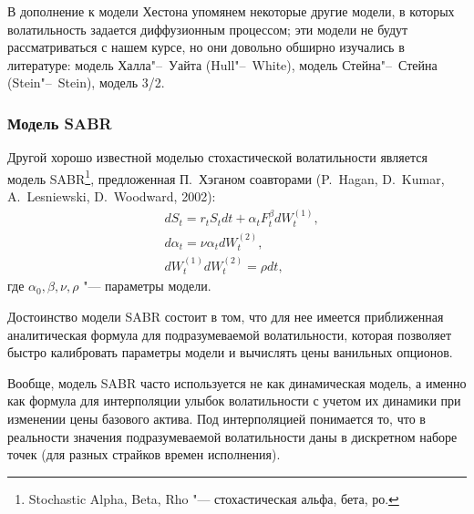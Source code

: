 
В дополнение к модели Хестона упомянем некоторые другие модели, в которых волатильность задается диффузионным процессом; эти модели не будут рассматриваться с нашем курсе, но они довольно обширно изучались в литературе: модель Халла"--~Уайта (Hull"--~White), модель Стейна"--~Стейна (Stein"--~Stein), модель 3/2.


\subsubsection{Модель SABR}

Другой хорошо известной моделью стохастической волатильности является модель SABR\footnote{Stochastic Alpha, Beta, Rho "--- стохастическая альфа, бета, ро.}, предложенная П.~Хэганом  соавторами (P.~Hagan, D.~Kumar, A.~Lesniewski, D.~Woodward, 2002):
\begin{align*}
&d S_t = r_t S_t dt + \alpha_t F_t^\beta d W_t^{(1)},\\
&d\alpha_t = \nu\alpha_t d W_t^{(2)},\\
&d W_t^{(1)} d W_t^{(2)} = \rho dt,
\end{align*}
где $\alpha_0,\beta,\nu,\rho$ "--- параметры модели.

Достоинство модели SABR состоит в том, что для нее имеется приближенная аналитическая формула для подразумеваемой волатильности, которая  позволяет быстро калибровать параметры модели и вычислять цены ванильных опционов.

Вообще, модель SABR часто используется не как динамическая модель, а именно как формула для интерполяции улыбок волатильности с учетом их динамики при изменении цены базового актива.
Под интерполяцией понимается то, что в реальности значения подразумеваемой волатильности даны в дискретном наборе точек (для разных страйков времен исполнения).

